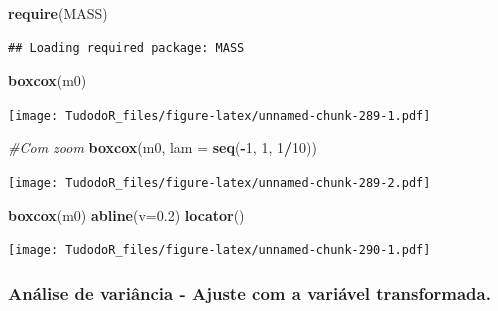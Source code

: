 \documentclass[
]{book}
\newenvironment{Shaded}{\begin{snugshade}}{\end{snugshade}}
\newcommand{\CommentTok}[1]{\textcolor[rgb]{0.56,0.35,0.01}{\textit{#1}}}
\newcommand{\DataTypeTok}[1]{\textcolor[rgb]{0.13,0.29,0.53}{#1}}
\newcommand{\DecValTok}[1]{\textcolor[rgb]{0.00,0.00,0.81}{#1}}
\newcommand{\FloatTok}[1]{\textcolor[rgb]{0.00,0.00,0.81}{#1}}
\newcommand{\KeywordTok}[1]{\textcolor[rgb]{0.13,0.29,0.53}{\textbf{#1}}}
\newcommand{\NormalTok}[1]{#1}
\newcommand{\OperatorTok}[1]{\textcolor[rgb]{0.81,0.36,0.00}{\textbf{#1}}}
\newcommand{\StringTok}[1]{\textcolor[rgb]{0.31,0.60,0.02}{#1}}
\begin{document}
\begin{Shaded}
\begin{Highlighting}[]
\KeywordTok{require}\NormalTok{(MASS) }
\end{Highlighting}
\end{Shaded}

\begin{verbatim}
## Loading required package: MASS
\end{verbatim}

\begin{Shaded}
\begin{Highlighting}[]
  \KeywordTok{boxcox}\NormalTok{(m0)}
\end{Highlighting}
\end{Shaded}

\texttt{[image: TudodoR\_files/figure-latex/unnamed-chunk-289-1.pdf]}

\begin{Shaded}
\begin{Highlighting}[]
  \CommentTok{#Com zoom}
  \KeywordTok{boxcox}\NormalTok{(m0, }\DataTypeTok{lam =} \KeywordTok{seq}\NormalTok{(}\OperatorTok{-}\DecValTok{1}\NormalTok{, }\DecValTok{1}\NormalTok{, }\DecValTok{1}\OperatorTok{/}\DecValTok{10}\NormalTok{))}
\end{Highlighting}
\end{Shaded}

\texttt{[image: TudodoR\_files/figure-latex/unnamed-chunk-289-2.pdf]}

\begin{Shaded}
\begin{Highlighting}[]
  \KeywordTok{boxcox}\NormalTok{(m0)}
  \KeywordTok{abline}\NormalTok{(}\DataTypeTok{v=}\FloatTok{0.2}\NormalTok{)}
  \KeywordTok{locator}\NormalTok{()}
\end{Highlighting}
\end{Shaded}

\texttt{[image: TudodoR\_files/figure-latex/unnamed-chunk-290-1.pdf]}

\hypertarget{anuxe1lise-de-variuxe2ncia---ajuste-com-a-variuxe1vel-transformada.}{%
\subsubsection{Análise de variância - Ajuste com a variável transformada.}\label{anuxe1lise-de-variuxe2ncia---ajuste-com-a-variuxe1vel-transformada.}}

\begin{Shaded}
\end{Shaded}
\end{document}
